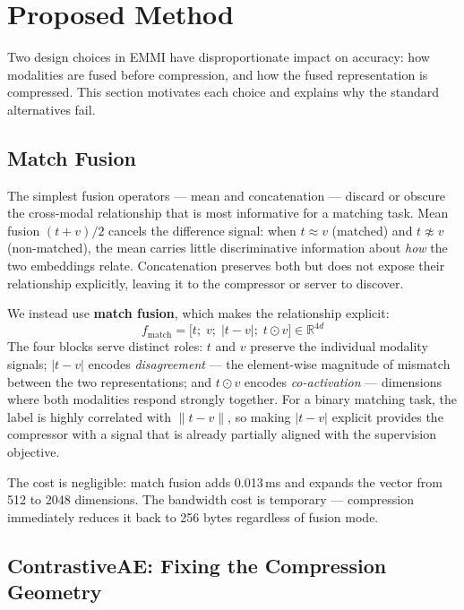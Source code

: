 \documentclass[10pt,twocolumn]{article}
\begin{document}
\section{Proposed Method}
\label{sec:method}

Two design choices in EMMI have disproportionate impact on accuracy:
how modalities are fused before compression, and how the fused
representation is compressed. This section motivates each choice and
explains why the standard alternatives fail.

\subsection{Match Fusion}

The simplest fusion operators --- mean and concatenation --- discard or
obscure the cross-modal relationship that is most informative for a
matching task. Mean fusion $(t + v)/2$ cancels the difference signal:
when $t \approx v$ (matched) and $t \not\approx v$ (non-matched), the
mean carries little discriminative information about \emph{how} the two
embeddings relate. Concatenation preserves both but does not expose
their relationship explicitly, leaving it to the compressor or server
to discover.

We instead use \textbf{match fusion}, which makes the relationship explicit:
\begin{equation}
f_\text{match} = \bigl[t;\;v;\;|t - v|;\;t \odot v\bigr] \in \mathbb{R}^{4d}
\label{eq:match}
\end{equation}
The four blocks serve distinct roles: $t$ and $v$ preserve the individual
modality signals; $|t-v|$ encodes \emph{disagreement} --- the
element-wise magnitude of mismatch between the two representations;
and $t \odot v$ encodes \emph{co-activation} --- dimensions where both
modalities respond strongly together. For a binary matching task, the
label is highly correlated with $\|t - v\|$, so making $|t-v|$ explicit
provides the compressor with a signal that is already partially aligned
with the supervision objective.

The cost is negligible: match fusion adds 0.013\,ms and expands the
vector from 512 to 2048 dimensions. The bandwidth cost is temporary ---
compression immediately reduces it back to 256 bytes regardless of
fusion mode.

\subsection{ContrastiveAE: Fixing the Compression Geometry}
\end{document}
